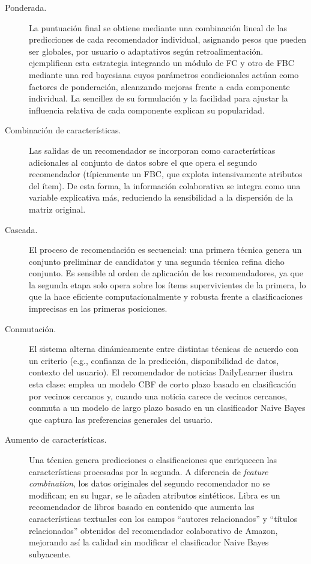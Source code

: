 \begin{description}
	\item[Ponderada.] La puntuación final se obtiene mediante una combinación lineal de las predicciones de cada recomendador individual, asignando pesos que pueden ser globales, por usuario o adaptativos según retroalimentación. \citet{decampos_combining_2010} ejemplifican esta estrategia integrando un módulo de FC y otro de FBC mediante una red bayesiana cuyos parámetros condicionales actúan como factores de ponderación, alcanzando mejoras frente a cada componente individual. La sencillez de su formulación y la facilidad para ajustar la influencia relativa de cada componente explican su popularidad.

	\item[Combinación de características.] Las salidas de un recomendador se incorporan como características adicionales al conjunto de datos sobre el que opera el segundo recomendador (típicamente un FBC, que explota intensivamente atributos del ítem). De esta forma, la información colaborativa se integra como una variable explicativa más, reduciendo la sensibilidad a la dispersión de la matriz original.

	\item[Cascada.] El proceso de recomendación es secuencial: una primera técnica genera un conjunto preliminar de candidatos y una segunda técnica refina dicho conjunto. Es sensible al orden de aplicación de los recomendadores, ya que la segunda etapa solo opera sobre los ítems supervivientes de la primera, lo que la hace eficiente computacionalmente y robusta frente a clasificaciones imprecisas en las primeras posiciones.

	\item[Conmutación.] El sistema alterna dinámicamente entre distintas técnicas de acuerdo con un criterio (e.g., confianza de la predicción, disponibilidad de datos, contexto del usuario). El recomendador de noticias DailyLearner \citep{billsus_learning_2000} ilustra esta clase: emplea un modelo CBF de corto plazo basado en clasificación por vecinos cercanos y, cuando una noticia carece de vecinos cercanos, conmuta a un modelo de largo plazo basado en un clasificador Naive Bayes que captura las preferencias generales del usuario.

	\item[Aumento de características.] Una técnica genera predicciones o clasificaciones que enriquecen las características procesadas por la segunda. A diferencia de \textit{feature combination}, los datos originales del segundo recomendador no se modifican; en su lugar, se le añaden atributos sintéticos. Libra \citep{mooney_content-based_2000} es un recomendador de libros basado en contenido que aumenta las características textuales con los campos ``autores relacionados'' y ``títulos relacionados'' obtenidos del recomendador colaborativo de Amazon, mejorando así la calidad sin modificar el clasificador Naive Bayes subyacente.


\end{description}
